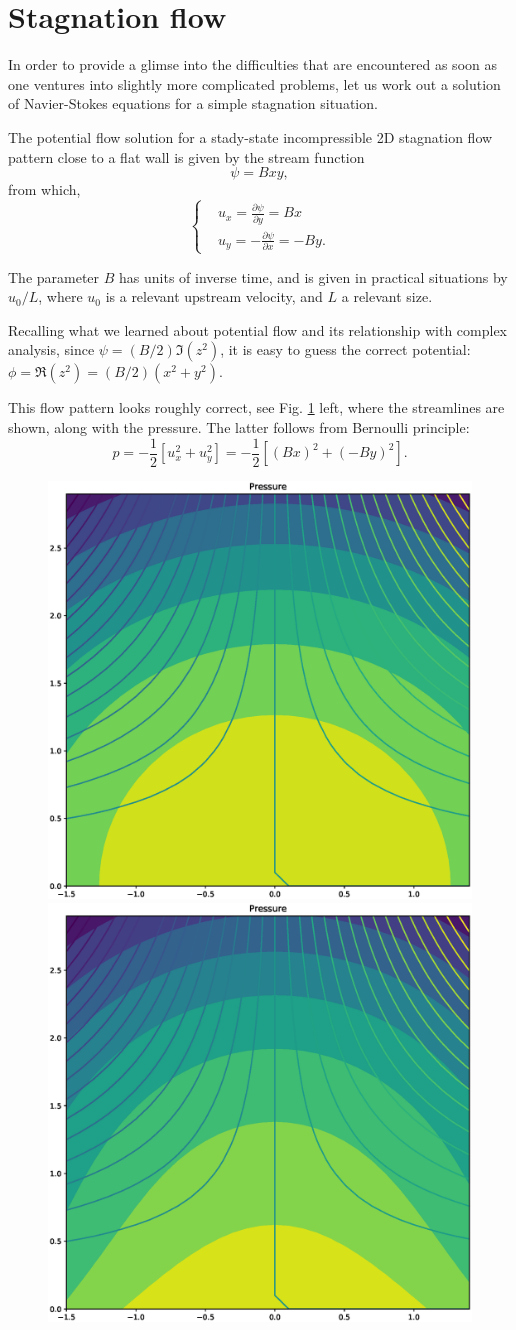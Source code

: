 \section{Stagnation flow}

In order to provide a glimse into the difficulties that are
encountered as soon as one ventures into slightly more complicated
problems, let us work out a solution of Navier-Stokes equations for a
simple stagnation situation.

The potential flow solution for a stady-state incompressible 2D
stagnation flow pattern close to a flat wall is given by the stream
function
\[
\psi = B x y ,
\]
from which,
\[
\begin{cases}
  & u_x =  \frac{\partial \psi}{\partial y} =   B x \\
  & u_y = -\frac{\partial \psi}{\partial x} = - B y .
\end{cases}
\]

The parameter $B$ has units of inverse time, and is given in practical
situations by $u_0 / L$, where $u_0$ is a relevant upstream velocity,
and $L$ a relevant size.

Recalling what we learned about potential flow and its relationship
with complex analysis, since $\psi = (B/2) \Im (z^2)$, it is easy to guess the
correct potential: $\phi=\Re( z^2) = (B/2) (x^2 + y^2)$.

This flow pattern looks roughly correct, see
Fig. \ref{fig:stagnation_streamlines} left, where the streamlines are
shown, along with the pressure. The latter follows from Bernoulli
principle:
\begin{equation}
  \label{eq:p_stag_pot}
p =
 -\frac{1}{2} \left[
  u_x ^2 +
  u_y^2
  \right] =
-\frac{1}{2} \left[
  (B x)^2 +
  (-B y)^2
  \right].  
\end{equation}


\begin{figure}
  \centering
  \includegraphics[width=0.4\linewidth]{figures/stagnation_potential_streamlines}
  \includegraphics[width=0.4\linewidth]{figures/stagnation_viscous_streamlines}
  \caption{\label{fig:stagnation_streamlines}}
\end{figure}

